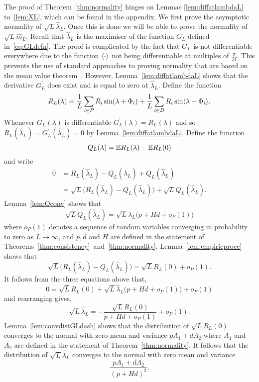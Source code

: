 \documentclass[journal]{IEEEtran}
\begin{document}
The proof of Theorem~\ref{thm:normality} hinges on Lemmas \ref{lem:diffatlambdaL} to~\ref{lem:XL}, which can be found in the appendix.  We first prove the asymptotic normality of $\sqrt{L} \hat{\lambda}_L$.  Once this is done we will be able to prove the normality of $\sqrt{L} \hat{m}_L$.  Recall that $\hat{\lambda}_L$ is the maximiser of the function $G_L$ defined in~\eqref{eq:GLdefn}.  The proof is complicated by the fact that $G_L$ is not differentiable everywhere due to the function $\left\langle \cdot \right\rangle$ not being differentiable at multiples of $\tfrac{\pi}{M}$.  This prevents the use of standard approaches to proving normality that are based on the mean value theorem~\cite{vonMises_diff_stats_1947,vanDerVart1971_asymptotic_stats,Pollard_new_ways_clts_1986,Pollard_conv_stat_proc_1984,Pollard_asymp_empi_proc_1989,van2009empirical}.  However, Lemma~\ref{lem:diffatlambdaL} shows that the derivative $G_L^\prime$ does exist and is equal to zero at $\hat{\lambda}_L$.  %
Define the function
\begin{equation}\label{eq:RLdef}
R_L(\lambda) = \frac{1}{L} \sum_{i \in P} R_i \sin(\lambda + \Phi_i) + \frac{1}{L} \sum_{i \in D} R_i \sin\langle \lambda + \Phi_i \rangle.
\end{equation}
Whenever $G_L(\lambda)$ is differentiable $G_L^\prime(\lambda) = R_L(\lambda)$ and so $R_L(\hat{\lambda}_L) = G_L^\prime(\hat{\lambda}_L) = 0$ by Lemma~\ref{lem:diffatlambdaL}.  Define the function 
\[
Q_L(\lambda) = {\mathbb E} R_L(\lambda) - {\mathbb E} R_L(0)
\]
and write
\begin{align*}
0 &= R_L(\hat{\lambda}_L) - Q_L(\hat{\lambda}_L) + Q_L(\hat{\lambda}_L) \\
&= \sqrt{L}\big( R_L(\hat{\lambda}_L) - Q_L(\hat{\lambda}_L) \big) + \sqrt{L}Q_L(\hat{\lambda}_L).
\end{align*}
Lemma~\ref{lem:Qconv} shows that
\[
\sqrt{L} Q_L(\hat{\lambda}_L) = \sqrt{L} \hat{\lambda}_L\big( p + Hd  + o_P(1) \big)
\]
where $o_P(1)$ denotes a sequence of random variables converging in probability to zero as $L \rightarrow \infty$, and $p,d$ and $H$ are defined in the statement of Theorems~\ref{thm:consistency}~and~\ref{thm:normality}.  Lemma~\ref{lem:empiricprocc} shows that
\[
\sqrt{L}\big( R_L(\hat{\lambda}_L) - Q_L(\hat{\lambda}_L) \big) = \sqrt{L} R_L(0) + o_P(1).
\]
It follows from the three equations above that,
\[
0 = \sqrt{L}R_L(0) + \sqrt{L} \hat{\lambda}_L \big( p + Hd  + o_P(1) \big) + o_P(1)
\]
and rearranging gives,
\[
\sqrt{L} \hat{\lambda}_L =  -\frac{\sqrt{L}R_L(0)}{p + Hd  + o_P(1)} + o_P(1).
\]
Lemma~\ref{lem:convdistGLdash} shows that the distribution of $\sqrt{L}R_L(0)$ converges to the normal with zero mean and variance $pA_1 + dA_2$ where $A_1$ and $A_2$ are defined in the statement of Theorem~\ref{thm:normality}.  It follows that the distribution of $\sqrt{L}\hat{\lambda}_L$ converges to the normal with zero mean and variance
\[
\frac{pA_1 + dA_2}{(p + Hd)^2}.
\]
 
\end{document}
